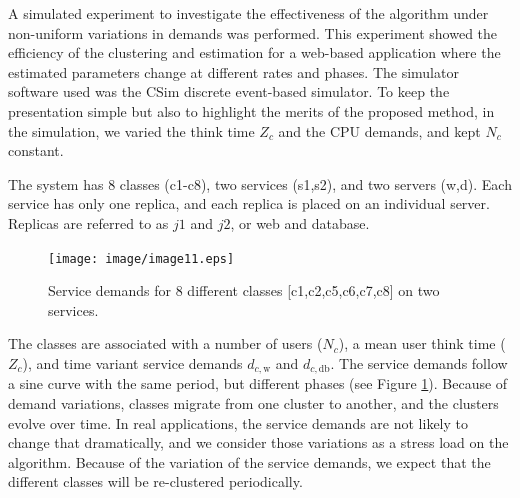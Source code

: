 A simulated experiment to investigate the effectiveness of the algorithm under non-uniform variations in demands was performed. This experiment showed the efficiency of the clustering and estimation for a web-based application where the estimated parameters change at different rates and phases. 
 The simulator software used was the CSim discrete event-based simulator. 
To keep the presentation simple but also to highlight the merits of the proposed method, in the simulation, we varied the think time $Z_c$ and the CPU demands, and kept $N_c$ constant.        


The system has 8 classes (c1-c8), two services (s1,s2), and two servers (w,d). Each service has only one replica, and each replica is placed on an individual server. Replicas are referred to as $j1$ and $j2$, or web and database.        
\begin{figure}[htbp]
	\centering
   \texttt{[image: image/image11.eps]}
	\caption[A sample service demands for 8 different classes on two services.]{Service demands for 8 different classes [c1,c2,c5,c6,c7,c8] on two services.
	}
	\label{fig:service-demands-different-classes}   
\end{figure}
 
 The classes are associated with a number of users ($N_c$), a mean user think time ($Z_c$), and time variant service demands $d_{c,\text{w}}$ and $d_{c,\text{db}}$. The service demands follow a sine curve with the same period, but different phases (see Figure \ref{fig:service-demands-different-classes}). Because of demand variations, classes migrate from one cluster to another, and the clusters evolve over time. In real applications, the service demands are not likely to change that dramatically, and we consider those variations as a stress load on the algorithm. Because of the variation of the service demands, we expect that the different classes will be re-clustered periodically.                                                                     

